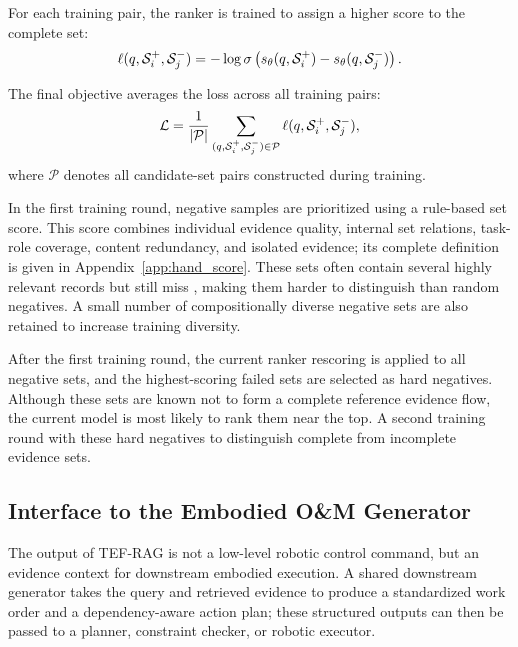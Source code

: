 For each training pair, the ranker is trained to assign a higher score to the complete set:
\begin{equation}
\ell(q,\mathcal{S}_i^+,\mathcal{S}_j^-)
=
-\log \sigma\left(
s_{\theta}(q,\mathcal{S}_i^+)
-
s_{\theta}(q,\mathcal{S}_j^-)
\right).
\label{eq:ranknet_pair_loss}
\end{equation}

The final objective averages the loss across all training pairs:
\begin{equation}
\mathcal{L}
=
\frac{1}{|\mathcal{P}|}
\sum_{(q,\mathcal{S}_i^+,\mathcal{S}_j^-)\in\mathcal{P}}
\ell(q,\mathcal{S}_i^+,\mathcal{S}_j^-),
\label{eq:ranknet_loss}
\end{equation}
where $\mathcal{P}$ denotes all candidate-set pairs constructed during training.

In the first training round, negative samples are prioritized using a rule-based set score. This score combines individual evidence quality, internal set relations, task-role coverage, content redundancy, and isolated evidence; its complete definition is given in Appendix~\ref{app:hand_score}. %
These sets often contain several highly relevant records but still miss , making them harder to distinguish than random negatives. A small number of compositionally diverse negative sets are also retained to increase training diversity.

After the first training round, the current ranker rescoring is applied to all negative sets, and the highest-scoring failed sets are selected as hard negatives. Although these sets are known not to form a complete reference evidence flow, the current model is most likely to rank them near the top. %
A second training round with these hard negatives  to distinguish complete from incomplete evidence sets.

\subsection{Interface to the Embodied O\&M Generator}

The output of TEF-RAG is not a low-level robotic control command, but an evidence context for downstream embodied execution. A shared downstream generator takes the query and retrieved evidence to produce a standardized work order and a dependency-aware action plan; these structured outputs can then be passed to a planner, constraint checker, or robotic executor.

